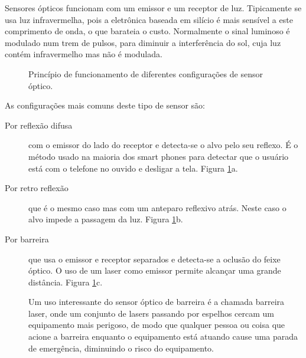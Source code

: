 Sensores ópticos funcionam com um emissor e um receptor de luz. Tipicamente se usa luz infravermelha, pois a eletrônica baseada em silício é mais sensível a este comprimento de onda, o que barateia o custo. Normalmente o sinal luminoso é modulado num trem de pulsos, para diminuir a interferência do sol, cuja luz contém infravermelho mas não é modulada.

\begin{figure}
  \centering
  \qquad

  \caption{Princípio de funcionamento de diferentes configurações de sensor óptico.}\label{fig:sensorOptico}
\end{figure}

As configurações mais comuns deste tipo de sensor são:
\begin{description}
  \item[Por reflexão difusa] com o emissor do lado do receptor e detecta-se o alvo pelo seu reflexo. É o método usado na maioria dos smart phones para detectar que o usuário está com o telefone no ouvido e desligar a tela. Figura \ref{fig:sensorOptico}a.
  \item[Por retro reflexão] que é o mesmo caso mas com um anteparo reflexivo atrás. Neste caso o alvo impede a passagem da luz. Figura \ref{fig:sensorOptico}b.
  \item[Por barreira] que usa o emissor e receptor separados e detecta-se a oclusão do feixe óptico. O uso de um laser como emissor permite alcançar uma grande distância. Figura \ref{fig:sensorOptico}c.

  Um uso interessante do sensor óptico de barreira é a chamada barreira laser, onde um conjunto de lasers passando por espelhos cercam um equipamento mais perigoso, de modo que qualquer pessoa ou coisa que acione a barreira enquanto o equipamento está atuando cause uma parada de emergência, diminuindo o risco do equipamento.
\end{description}

